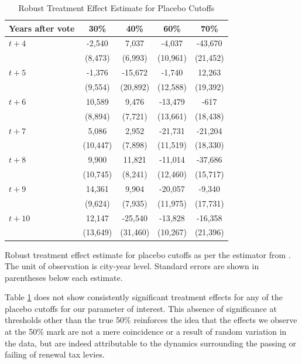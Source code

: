 \begin{table}[ht]
    \centering
    \caption{Robust Treatment Effect Estimate for Placebo Cutoffs}
    \label{tab:placebo_cutoffs}
    \begin{tabular}{p{2cm}cccc}
        \hline
        Years after vote & 30\% & 40\% & 60\% & 70\% \\
        \hline
        $t + 4$ & -2,540 & 7,037 & -4,037 & -43,670 \\
        & (8,473) & (6,993) & (10,961) & (21,452) \\
        $t + 5$ & -1,376 & -15,672 & -1,740 & 12,263 \\
        & (9,554) & (20,892) & (12,588) & (19,392) \\
        $t + 6$ & 10,589 & 9,476 & -13,479 & -617 \\
        & (8,894) & (7,721) & (13,661) & (18,438) \\
        $t + 7$ & 5,086 & 2,952 & -21,731 & -21,204 \\
        & (10,447) & (7,898) & (11,519) & (18,330) \\
        $t + 8$ & 9,900 & 11,821 & -11,014 & -37,686 \\
        & (10,745) & (8,241) & (12,460) & (15,717) \\
        $t + 9$ & 14,361 & 9,904 & -20,057 & -9,340 \\
        & (9,624) & (7,935) & (11,975) & (17,731) \\
        $t + 10$ & 12,147 & -25,540 & -13,828 & -16,358 \\
        & (13,649) & (31,460) & (10,267) & (21,396) \\
        \hline
    \end{tabular}
    \begin{tablenotes}
        \small
        \item Robust treatment effect estimate for placebo cutoffs as per the estimator from \cite{calonico2017rdrobust}. The unit of observation is city-year level. Standard errors are shown in parentheses below each estimate.
    \end{tablenotes}
\end{table}

Table \ref{tab:placebo_cutoffs} does not show consistently significant treatment effects for any of the placebo cutoffs for our parameter of interest. This absence of significance at thresholds other than the true 50\% reinforces the idea that the effects we observe at the 50\% mark are not a mere coincidence or a result of random variation in the data, but are indeed attributable to the dynamics surrounding the passing or failing of renewal tax levies. 

